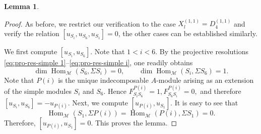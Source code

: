 \documentclass[12pt,reqno]{amsart}
\numberwithin{equation}{section}
\newcommand{\Hom}{\operatorname{Hom}\nolimits}
\renewcommand{\dim}{\operatorname{dim}\nolimits}
\newtheorem{lemma}[theorem]{Lemma}
\begin{document}
\begin{lemma}
	\end{lemma}
	
	\begin{proof}
		As before, we restrict our verification to the case $X_l^{(1,1)}=D_4^{(1,1)}$ and verify the relation $[u_{S_i},u_{S_6},u_{S_1}]=0$, the other cases can be established similarly.
		
		We first compute $[u_{S_i},u_{S_6}]$. Note that $1<i<6$. By the projective resolutions \eqref{eq:pro-res-simple 1}--\eqref{eq:pro-res-simple i}, one readily obtains
		\[
		\dim\Hom_{\mathcal{M}}(S_6,\Sigma S_i)=0,
		\qquad
		\dim\Hom_{\mathcal{M}}(S_i,\Sigma S_6)=1.
		\]
		Note that $P(i)$ is the unique indecomposable $A$-module arising as an extension of the simple modules $S_i$ and $S_6$. Hence
		$F_{S_iS_6}^{P(i)}=1,
		F_{S_6S_i}^{P(i)}=0,$
		and therefore
		$[u_{S_i},u_{S_6}]=-u_{P(i)}.$ Next, we compute $[u_{P(i)},u_{S_1}]$. It is easy to see that
		\[
		\Hom_{\mathcal{M}}(S_1,\Sigma P(i))=\Hom_{\mathcal{M}}(P(i),\Sigma S_1)=0.
		\]
		Therefore,
		$[u_{P(i)},u_{S_1}]=0.$
		This proves the lemma.
	\end{proof}
	
\end{document}
